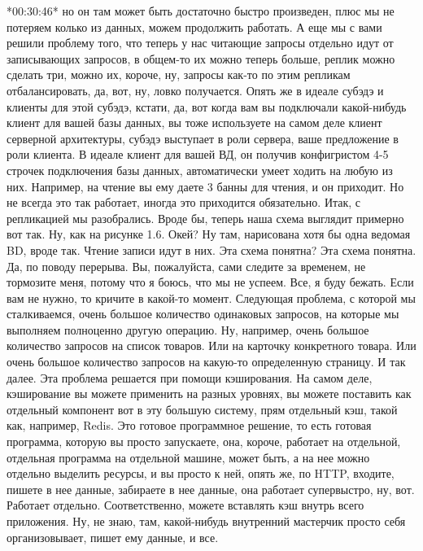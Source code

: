 \documentclass[12pt]{article} %
\begin{document}
*00:30:46*
но он там может быть достаточно быстро произведен, плюс мы не потеряем колько из данных, можем продолжить работать. А еще мы с вами решили проблему того, что  теперь у нас читающие запросы отдельно идут от записывающих запросов, в общем-то их можно теперь больше, реплик можно сделать три, можно их, короче, ну, запросы как-то по этим репликам отбалансировать, да, вот, ну, ловко получается. Опять же в идеале субэдэ и клиенты для этой субэдэ, кстати, да, вот когда вам вы подключали какой-нибудь клиент для вашей базы данных, вы тоже используете на самом деле клиент серверной архитектуры, субэдэ выступает в роли сервера, ваше предложение в роли клиента.  В идеале клиент для вашей ВД, он получив конфигристом 4-5 строчек подключения базы данных, автоматически умеет ходить на любую из них.  Например, на чтение вы ему даете 3 банны для чтения, и он приходит.  Но не всегда это так работает, иногда это приходится обязательно.  Итак, с репликацией мы разобрались.  Вроде бы, теперь наша схема выглядит примерно вот так.  Ну, как на рисунке 1.6.  Окей?  Ну там, нарисована хотя бы одна ведомая BD, вроде так.  Чтение записи идут в них.  Эта схема понятна?  Эта схема понятна.  Да, по поводу перерыва.  Вы, пожалуйста, сами следите за временем, не тормозите меня, потому что я боюсь, что мы не успеем.  Все, я буду бежать. Если вам не нужно, то кричите в какой-то момент.  Следующая проблема, с которой мы сталкиваемся, очень большое количество одинаковых запросов, на которые мы выполняем полноценно другую операцию.  Ну, например, очень большое количество запросов на список товаров.  Или на карточку конкретного товара.  Или очень большое количество запросов на какую-то определенную страницу.  И так далее.  Эта проблема решается при помощи кэширования.  На самом деле, кэширование вы можете применить на разных уровнях, вы можете поставить как отдельный компонент вот в эту большую систему, прям отдельный кэш, такой как, например, Redis.  Это готовое программное решение, то есть готовая программа, которую вы просто запускаете, она, короче, работает на отдельной, отдельная программа на отдельной машине, может быть, а на нее можно отдельно выделить ресурсы, и вы просто к ней, опять же, по HTTP, входите, пишете в нее данные, забираете в нее данные, она работает супервыстро, ну, вот. Работает отдельно.  Соответственно, можете вставлять кэш внутрь всего приложения.  Ну, не знаю, там, какой-нибудь внутренний мастерчик просто себя организовывает, пишет ему данные, и все.
\end{document}
